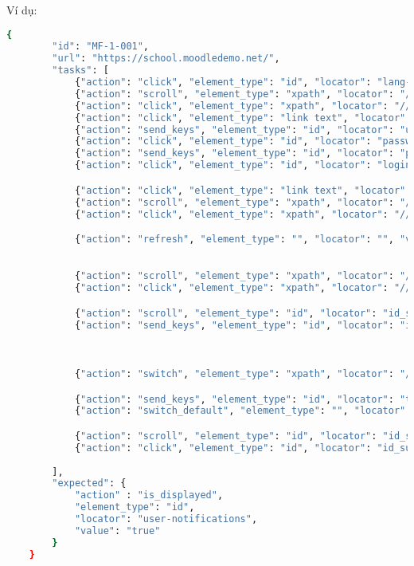 Ví dụ:
\begin{lstlisting}[language=bash, caption={Ví dụ testcase MF-1-001 ở level 2}, breaklines=true]
    {
        "id": "MF-1-001",
        "url": "https://school.moodledemo.net/",
        "tasks": [
            {"action": "click", "element_type": "id", "locator": "lang-menu-toggle", "value": null},
            {"action": "scroll", "element_type": "xpath", "locator": "//*[@id='lang-action-menu']/a[101]", "value": null},
            {"action": "click", "element_type": "xpath", "locator": "//*[@id='lang-action-menu']/a[101]", "value": null},
            {"action": "click", "element_type": "link text", "locator": "Đăng nhập", "value": null},
            {"action": "send_keys", "element_type": "id", "locator": "username", "value": "teacher"},
            {"action": "click", "element_type": "id", "locator": "password", "value": null},
            {"action": "send_keys", "element_type": "id", "locator": "password", "value": "moodle2024"},
            {"action": "click", "element_type": "id", "locator": "loginbtn", "value": null},

            {"action": "click", "element_type": "link text", "locator": "Mindful course creation", "value": null},
            {"action": "scroll", "element_type": "xpath", "locator": "//*[@id='module-967']/div/div[2]/div[2]/div/div/a", "value": null},
            {"action": "click", "element_type": "xpath", "locator": "//*[@id='module-967']/div/div[2]/div[2]/div/div/a", "value": null},

            {"action": "refresh", "element_type": "", "locator": "", "value": null},
            

            {"action": "scroll", "element_type": "xpath", "locator": "//*[@id='region-main']/div[2]/div[1]/div/div[2]/a", "value": null},
            {"action": "click", "element_type": "xpath", "locator": "//*[@id='region-main']/div[2]/div[1]/div/div[2]/a", "value": null},

            {"action": "scroll", "element_type": "id", "locator": "id_subject", "value": null},
            {"action": "send_keys", "element_type": "id", "locator": "id_subject", "value": "Assignment Submit Date"},
            
            

            {"action": "switch", "element_type": "xpath", "locator": "//*[@id='id_message_ifr']", "value": null},

            {"action": "send_keys", "element_type": "id", "locator": "tinymce", "value": "Before 24/11/2024"},
            {"action": "switch_default", "element_type": "", "locator": null, "value": null},

            {"action": "scroll", "element_type": "id", "locator": "id_submitbutton", "value": null},
            {"action": "click", "element_type": "id", "locator": "id_submitbutton", "value": null}
            
        ],
        "expected": {
            "action" : "is_displayed",
            "element_type": "id",
            "locator": "user-notifications",
            "value": "true"
        }
    }
\end{lstlisting}

